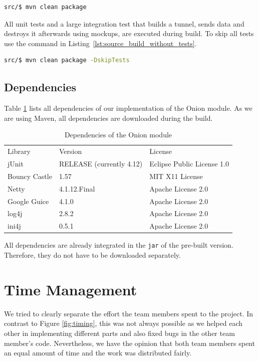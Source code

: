 \documentclass[paper=letter, fontsize=12pt]{article}
\begin{document}
\begin{lstlisting}[language=bash, caption=Build the project from source, label=lst:source_build]
src/$ mvn clean package
\end{lstlisting}

All unit tests and a large integration test that builds a tunnel, sends data and destroys it afterwards using mockups, are executed during build.
To skip all tests use the command in Listing~\ref{lst:source_build_without_tests}.

\begin{lstlisting}[language=bash, caption=Build the project from source without tests, label=lst:source_build_without_tests]
src/$ mvn clean package -DskipTests
\end{lstlisting}


\subsection{Dependencies}
Table \ref{tab:dependencies} lists all dependencies of our implementation of the Onion module.
As we are using Maven, all dependencies are downloaded during the build.

\begin{table}[H]
    \centering
    \caption{Dependencies of the Onion module}
    \label{tab:dependencies}
    \begin{tabular}{l|l|l}
        Library         & Version                   & License \\ \Xhline{3\arrayrulewidth}
        jUnit           & RELEASE (currently 4.12)  & Eclipse Public License 1.0 \\
        Bouncy Castle   & 1.57                      & MIT X11 License \\
        Netty           & 4.1.12.Final              & Apache License 2.0 \\
        Google Guice    & 4.1.0                     & Apache License 2.0 \\
        log4j           & 2.8.2                     & Apache License 2.0 \\
        ini4j           & 0.5.1                     & Apache License 2.0
    \end{tabular}
\end{table}

All dependencies are already integrated in the \texttt{jar} of the pre-built version.
Therefore, they do not have to be downloaded separately.

\section{Time Management}
We tried to clearly separate the effort the team members spent to the project.
In contrast to Figure \ref{fig:timing}, this was not always possible as we helped each other in implementing different parts and also fixed bugs in the other team member's code.
Nevertheless, we have the opinion that both team members spent an equal amount of time and the work was distributed fairly.
\end{document}
